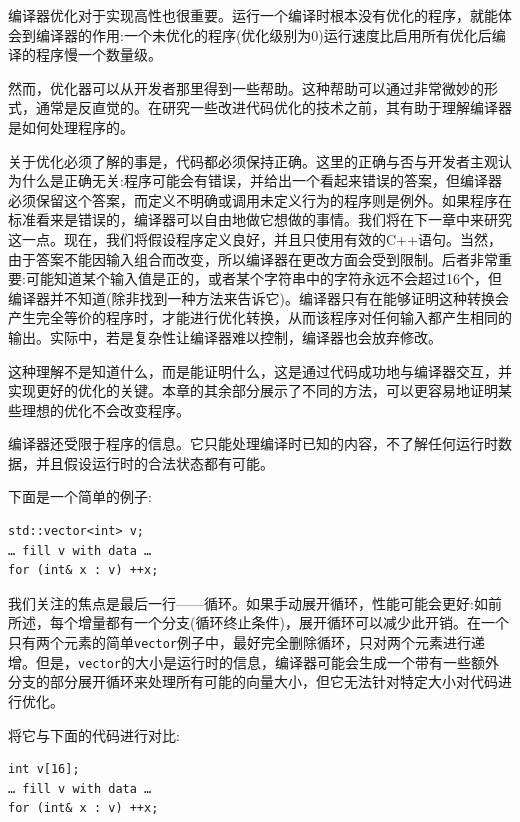 
编译器优化对于实现高性也很重要。运行一个编译时根本没有优化的程序，就能体会到编译器的作用:一个未优化的程序(优化级别为0)运行速度比启用所有优化后编译的程序慢一个数量级。

然而，优化器可以从开发者那里得到一些帮助。这种帮助可以通过非常微妙的形式，通常是反直觉的。在研究一些改进代码优化的技术之前，其有助于理解编译器是如何处理程序的。


关于优化必须了解的事是，代码都必须保持正确。这里的正确与否与开发者主观认为什么是正确无关:程序可能会有错误，并给出一个看起来错误的答案，但编译器必须保留这个答案，而定义不明确或调用未定义行为的程序则是例外。如果程序在标准看来是错误的，编译器可以自由地做它想做的事情。我们将在下一章中来研究这一点。现在，我们将假设程序定义良好，并且只使用有效的C++语句。当然，由于答案不能因输入组合而改变，所以编译器在更改方面会受到限制。后者非常重要:可能知道某个输入值是正的，或者某个字符串中的字符永远不会超过16个，但编译器并不知道(除非找到一种方法来告诉它)。编译器只有在能够证明这种转换会产生完全等价的程序时，才能进行优化转换，从而该程序对任何输入都产生相同的输出。实际中，若是复杂性让编译器难以控制，编译器也会放弃修改。

这种理解不是知道什么，而是能证明什么，这是通过代码成功地与编译器交互，并实现更好的优化的关键。本章的其余部分展示了不同的方法，可以更容易地证明某些理想的优化不会改变程序。

编译器还受限于程序的信息。它只能处理编译时已知的内容，不了解任何运行时数据，并且假设运行时的合法状态都有可能。

下面是一个简单的例子:

\begin{lstlisting}[style=styleCXX]
std::vector<int> v;
… fill v with data … 
for (int& x : v) ++x;
\end{lstlisting}

我们关注的焦点是最后一行——循环。如果手动展开循环，性能可能会更好:如前所述，每个增量都有一个分支(循环终止条件)，展开循环可以减少此开销。在一个只有两个元素的简单\texttt{vector}例子中，最好完全删除循环，只对两个元素进行递增。但是，\texttt{vector}的大小是运行时的信息，编译器可能会生成一个带有一些额外分支的部分展开循环来处理所有可能的向量大小，但它无法针对特定大小对代码进行优化。

将它与下面的代码进行对比:

\begin{lstlisting}[style=styleCXX]
int v[16];
… fill v with data … 
for (int& x : v) ++x;
\end{lstlisting}

